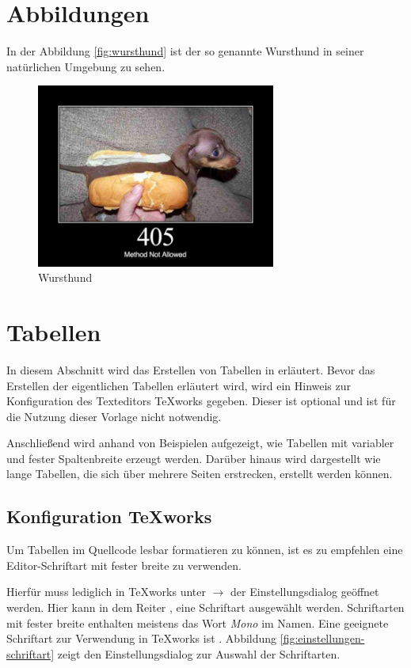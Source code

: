 \section{Abbildungen}

In der Abbildung \vref{fig:wursthund} ist der so genannte Wursthund in seiner natürlichen Umgebung zu sehen.

\begin{figure}[htbp]
	\centering
	\includegraphics[width=0.7\textwidth]{bilder/wursthund.jpg}
	\caption{Wursthund}
	\label{fig:wursthund}
\end{figure}


\section{Tabellen}

In diesem Abschnitt wird das Erstellen von Tabellen in \latex erläutert. Bevor das Erstellen der eigentlichen Tabellen erläutert wird, wird ein Hinweis zur Konfiguration des Texteditors TeXworks gegeben. Dieser ist optional und ist für die Nutzung dieser Vorlage nicht notwendig.

Anschließend wird anhand von Beispielen aufgezeigt, wie Tabellen mit variabler und fester Spaltenbreite erzeugt werden. Darüber hinaus wird dargestellt wie lange Tabellen, die sich über mehrere Seiten erstrecken, erstellt werden können.


\subsection{Konfiguration TeXworks}

Um Tabellen im Quellcode lesbar formatieren zu können, ist es zu empfehlen eine Editor-Schriftart mit fester breite zu verwenden.

Hierfür muss lediglich in TeXworks unter  $\rightarrow$  der Einstellungsdialog geöffnet werden. Hier kann in dem Reiter , eine Schriftart ausgewählt werden. Schriftarten mit fester breite enthalten meistens das Wort \emph{Mono} im Namen. Eine geeignete Schriftart zur Verwendung in TeXworks ist . Abbildung \vref{fig:einstellungen-schriftart} zeigt den Einstellungsdialog zur Auswahl der Schriftarten.

